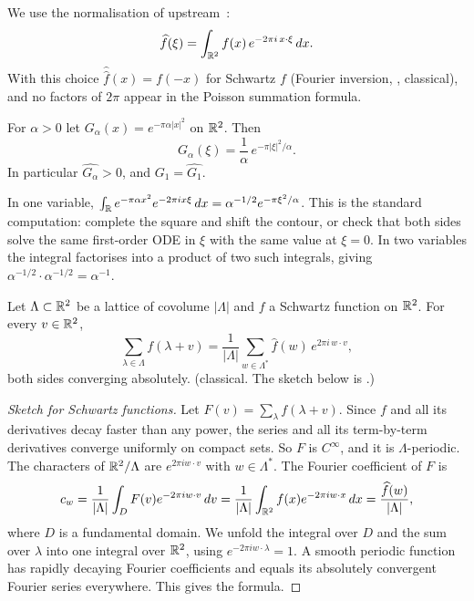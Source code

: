 We use the normalisation of upstream~\cite{oai}:
\[
  \widehat f(\xi)=\int_{\mathbb{R}^2}f(x)\,e^{-2\pi i\,x\cdot\xi}\,dx .
\]
With this choice $\widehat{\widehat f}(x)=f(-x)$ for Schwartz $f$ (Fourier inversion, \tierL{}, classical), and no
factors of $2\pi$ appear in the Poisson summation formula.

\begin{proposition}[Gaussians]\label{prop:gauss-ft}
For $\alpha>0$ let $G_\alpha(x)=e^{-\pi\alpha|x|^2}$ on $\mathbb{R}^2$. Then
\[
  \widehat{G_\alpha}(\xi)=\frac1\alpha\,e^{-\pi|\xi|^2/\alpha}.
\]
In particular $\widehat{G_\alpha}>0$, and $G_1=\widehat{G_1}$.
\end{proposition}
\begin{humanproof}
In one variable, $\int_{\mathbb{R}} e^{-\pi\alpha x^2}e^{-2\pi ix\xi}\,dx=\alpha^{-1/2}e^{-\pi\xi^2/\alpha}$. This is the standard
computation: complete the square and shift the contour, or check that both sides solve the same first-order ODE in
$\xi$ with the same value at $\xi=0$. In two variables the integral factorises into a product of two such integrals,
giving $\alpha^{-1/2}\cdot\alpha^{-1/2}=\alpha^{-1}$. \tierC{}
\end{humanproof}

\begin{theorem}\label{thm:poisson}
Let $\Lambda\subset\mathbb{R}^2$ be a lattice of covolume $|\Lambda|$ and $f$ a Schwartz function on $\mathbb{R}^2$. For every
$v\in\mathbb{R}^2$,
\[
  \sum_{\lambda\in\Lambda}f(\lambda+v)=\frac{1}{|\Lambda|}\sum_{w\in\Lambda^*}\widehat f(w)\,e^{2\pi i\,w\cdot v},
\]
both sides converging absolutely. \tierL{} (classical. The sketch below is \tierC{}.)
\end{theorem}
\begin{proof}[Sketch for Schwartz functions]
Let $F(v)=\sum_{\lambda}f(\lambda+v)$. Since $f$ and all its derivatives decay faster than any power, the series and all
its term-by-term derivatives converge uniformly on compact sets. So $F$ is $C^\infty$, and it is $\Lambda$-periodic.
The characters of $\mathbb{R}^2/\Lambda$ are $e^{2\pi iw\cdot v}$ with $w\in\Lambda^*$. The Fourier coefficient of $F$ is
\[
  c_w=\frac1{|\Lambda|}\int_{D}F(v)e^{-2\pi iw\cdot v}\,dv=\frac1{|\Lambda|}\int_{\mathbb{R}^2}f(x)e^{-2\pi iw\cdot x}\,dx
  =\frac{\widehat f(w)}{|\Lambda|},
\]
where $D$ is a fundamental domain. We unfold the integral over $D$ and the sum over $\lambda$ into one integral over
$\mathbb{R}^2$, using $e^{-2\pi iw\cdot\lambda}=1$. A smooth periodic function has rapidly decaying Fourier coefficients and
equals its absolutely convergent Fourier series everywhere. This gives the formula.
\end{proof}

